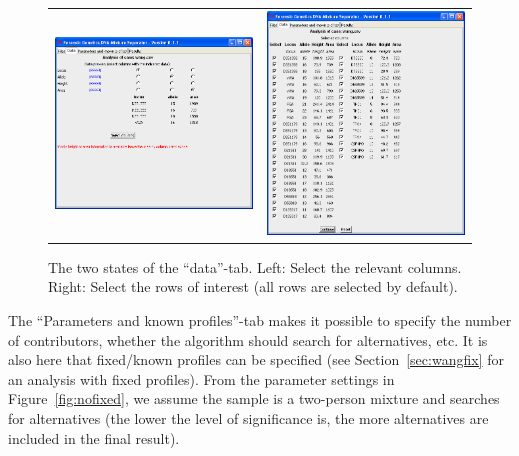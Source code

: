\documentclass[a4paper,11pt]{article}
\begin{document}
\begin{figure}[!h]
  \centering
    \begin{tabular}{cc}
      \parbox[b]{7.5cm}{\includegraphics[width=7.5cm]{data_columns}}&
      \parbox[b]{7.5cm}{\includegraphics[width=7.5cm]{data_rows}}
      \end{tabular}
  \caption{\label{fig:datatab}The two states of the
    ``data''-tab. Left: Select the relevant columns. Right: Select the
    rows of interest (all rows are selected by default).}
\end{figure}

The ``Parameters and known profiles''-tab makes it possible to specify
the number of contributors, whether the algorithm should search for
alternatives, etc. It is also here that fixed/known profiles can be
specified (see Section~\ref{sec:wangfix} for an analysis with fixed
profiles). From the parameter settings in Figure~\ref{fig:nofixed}, we
assume the sample is a two-person mixture and searches for
alternatives (the lower the level of significance is, the more
alternatives are included in the final result).
\end{document}
